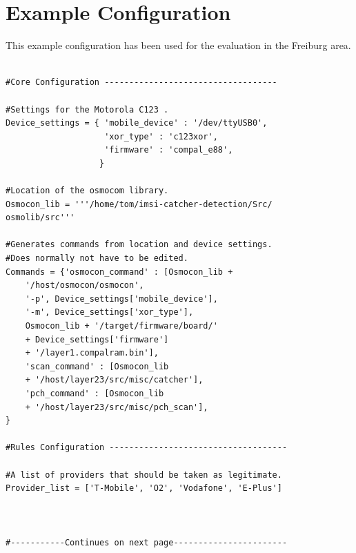 \section{Example Configuration}
\label{sec:example_config}
This example configuration has been used for the evaluation in the Freiburg area.\\\\
\hspace*{\dimexpr\fboxsep+\fboxrule}%
\begin{minipage}{\dimexpr\textwidth-4\fboxsep-2\fboxrule} 
\begin{lstlisting}
#Core Configuration -----------------------------------

#Settings for the Motorola C123 .
Device_settings = { 'mobile_device' : '/dev/ttyUSB0',
                    'xor_type' : 'c123xor',
                    'firmware' : 'compal_e88',
                   }

#Location of the osmocom library.
Osmocon_lib = '''/home/tom/imsi-catcher-detection/Src/
osmolib/src'''

#Generates commands from location and device settings.
#Does normally not have to be edited.
Commands = {'osmocon_command' : [Osmocon_lib + 
    '/host/osmocon/osmocon', 
    '-p', Device_settings['mobile_device'], 
    '-m', Device_settings['xor_type'], 
    Osmocon_lib + '/target/firmware/board/' 
    + Device_settings['firmware']
    + '/layer1.compalram.bin'],
    'scan_command' : [Osmocon_lib 
    + '/host/layer23/src/misc/catcher'],
    'pch_command' : [Osmocon_lib 
    + '/host/layer23/src/misc/pch_scan'],
}

#Rules Configuration ------------------------------------

#A list of providers that should be taken as legitimate.
Provider_list = ['T-Mobile', 'O2', 'Vodafone', 'E-Plus']



#-----------Continues on next page-----------------------
\end{lstlisting}
\end{minipage}\\\\
\hspace*{\dimexpr\fboxsep+\fboxrule}%
